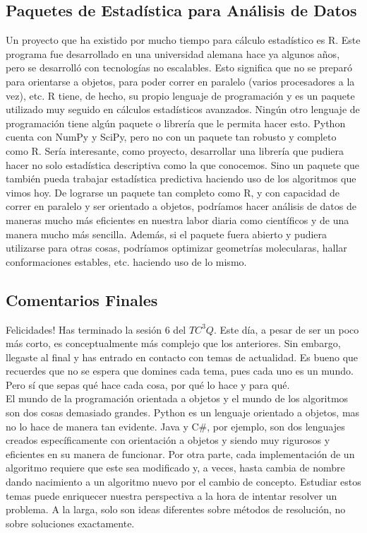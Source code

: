 \documentclass[10pt,letterpaper]{article}
\begin{document}
\subsection{Paquetes de Estad\'istica para An\'alisis de Datos}
Un proyecto que ha existido por mucho tiempo para c\'alculo estad\'istico es R. Este programa fue desarrollado en una universidad alemana hace ya algunos a\~nos, pero se desarroll\'o con tecnolog\'ias no escalables. Esto significa que no se prepar\'o para orientarse a objetos, para poder correr en paralelo (varios procesadores a la vez), etc. R tiene, de hecho, su propio lenguaje de programaci\'on y es un paquete utilizado muy seguido en c\'alculos estad\'isticos avanzados. Ning\'un otro lenguaje de programaci\'on tiene alg\'un paquete o librer\'ia que le permita hacer esto. Python cuenta con NumPy y SciPy, pero no con un paquete tan robusto y completo como R. Ser\'ia interesante, como proyecto, desarrollar una librer\'ia que pudiera hacer no solo estad\'istica descriptiva como la que conocemos. Sino un paquete que tambi\'en pueda trabajar estad\'istica predictiva haciendo uso de los algoritmos que vimos hoy. De lograrse un paquete tan completo como R, y con capacidad de correr en paralelo y ser orientado a objetos, podr\'iamos hacer an\'alisis de datos de maneras mucho m\'as eficientes en nuestra labor diaria como cient\'ificos y de una manera mucho m\'as sencilla. Adem\'as, si el paquete fuera abierto y pudiera utilizarse para otras cosas, podr\'iamos optimizar geometr\'ias molecularas, hallar conformaciones estables, etc. haciendo uso de lo mismo.

\subsection{Comentarios Finales}
Felicidades! Has terminado la sesi\'on 6 del $TC^3 Q$. Este d\'ia, a pesar de ser un poco m\'as corto, es conceptualmente m\'as complejo que los anteriores. Sin embargo, llegaste al final y has entrado en contacto con temas de actualidad. Es bueno que recuerdes que no se espera que domines cada tema, pues cada uno es un mundo. Pero s\'i que sepas qu\'e hace cada cosa, por qu\'e lo hace y para qu\'e.\\

El mundo de la programaci\'on orientada a objetos y el mundo de los algoritmos son dos cosas demasiado grandes. Python es un lenguaje orientado a objetos, mas no lo hace de manera tan evidente. Java y C\#, por ejemplo, son dos lenguajes creados espec\'ificamente con orientaci\'on a objetos y siendo muy rigurosos y eficientes en su manera de funcionar. Por otra parte, cada implementaci\'on de un algoritmo requiere que este sea modificado y, a veces, hasta cambia de nombre dando nacimiento a un algoritmo nuevo por el cambio de concepto. Estudiar estos temas puede enriquecer nuestra perspectiva a la hora de intentar resolver un problema. A la larga, solo son ideas diferentes sobre m\'etodos de resoluci\'on, no sobre soluciones exactamente.\\
\end{document}
